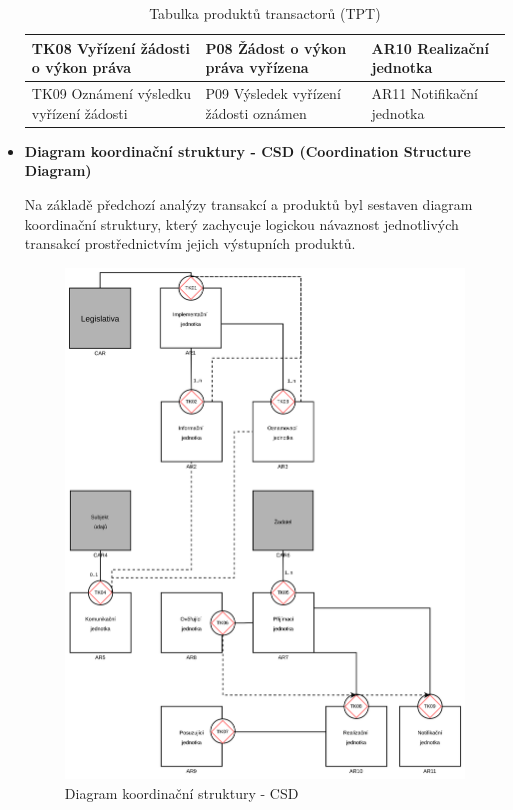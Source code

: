 \begin{itemize}
\begin{table}[H]
\begin{tabular}{|p{3.7cm}|p{4.2cm}|p{4.1cm}|}
    \hline
    TK08 \newline Vyřízení žádosti o výkon práva & P08 \newline Žádost o výkon práva vyřízena & AR10 \newline Realizační jednotka \\
    \hline
    TK09 \newline Oznámení výsledku vyřízení žádosti & P09 \newline Výsledek vyřízení žádosti oznámen & AR11 \newline Notifikační jednotka \\
    \hline
    \end{tabular}
    \caption{Tabulka produktů transactorů (TPT)}
\end{table}


  \item \textbf{Diagram koordinační struktury - CSD (Coordination Structure Diagram)}
  
  Na základě předchozí analýzy transakcí a produktů byl sestaven diagram koordinační struktury, který zachycuje logickou návaznost jednotlivých transakcí prostřednictvím jejich výstupních produktů.

  \begin{figure}[H]
    \centering
    \includegraphics[width=\textwidth]{images/demo_csd.png}
    \caption{Diagram koordinační struktury - CSD}
    \label{fig:demo_csd}
  \end{figure}

\end{itemize}

